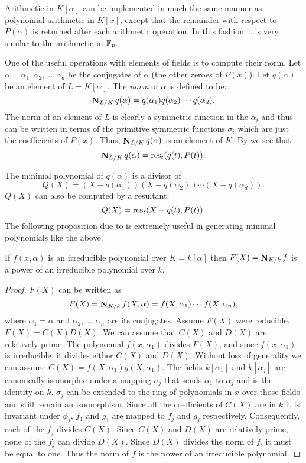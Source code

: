 Arithmetic in $K[\alpha]$ can be implemented in much the same manner
as polynomial arithmetic in $K[x]$, except that the remainder with
respect to $P(\alpha)$ is returned after each arithmetic operation.
In this fashion it is very similar to the arithmetic in
$\mathbb{F}_p$.

One of the useful operations with elements of fields is to compute their
norm.  Let $\alpha = \alpha_1,
\alpha_2, \ldots, \alpha_d$ be the conjugates of
$\alpha$ (the other zeroes of $P(x)$).  Let
$q(\alpha)$ be an element of $L = K[\alpha]$.  The {\em norm} of
$\alpha$ is defined to be:
\[
\mathop{\mathbf{N}}\nolimits_{L/K} q(\alpha) = q(\alpha_1) q(\alpha_2) \cdots q(\alpha_d).
\]
The norm of an element of $L$ is clearly a symmetric function in the
$\alpha_i$ and thus can be written in terms of the primitive symmetric
functions $\sigma_i$ which are just the coefficients of $P(x)$.  Thus,
$\mathop{\mathbf{N}}\nolimits_{L/K} q(\alpha)$ is an element of $K$.  By
 we see that
\[
\mathop{\mathbf{N}}\nolimits_{L/K} q(\alpha) = \mathop{\rm res}\nolimits_t (q(t), P(t)).
\]

The minimal polynomial of $q(\alpha)$ is a divisor of 
\[
Q(X) = (X - q(\alpha_1))(X - q(\alpha_2)) \cdots (X - q(\alpha_d)).
\]
$Q(X)$ can also be computed by a resultant:
\begin{equation} \label{AlgElt:Min:Eq}
Q(X) = \mathop{\rm res}\nolimits_t (X - q(t), P(t)).
\end{equation}
The following proposition due to {\Trager} \cite{Trager76a} is
extremely useful in generating minimal polynomials like the above.

\begin{proposition}[\Trager]
If $f(x, \alpha)$ is an irreducible polynomial over $K = k[\alpha]$
then $F(X) = \mathop{\mathbf{N}}\nolimits_{K/k} f$ is a power of an irreducible polynomial over $k$.
\end{proposition}

\begin{proof}
$F(X)$ can be written as
\[
F(X) = \mathop{\mathbf{N}}\nolimits_{K/k} f(X, \alpha) = f(X, \alpha_1) \cdots f(X, \alpha_n),
\]
where $\alpha_1 = \alpha$ and $\alpha_2, \ldots, \alpha_n$ are its
conjugates. Assume $F(X)$ were reducible, $F(X)= C(X)
D(X)$.  We can assume that $C(X)$ and $D(X)$ are relatively prime.
The polynomial $f(x, \alpha_1)$ divides $F(X)$, and since $f(x,
\alpha_1)$ is irreducible, it divides either $C(X)$ and $D(X)$.
Without loss of generality we can assume $C(X) = f(X, \alpha_1) g(X,
\alpha_1)$.  The fields $k[\alpha_1]$ and $k[\alpha_j]$ are
canonically isomorphic under a mapping $\sigma_j$ that sends
$\alpha_1$ to $\alpha_j$ and is the identity on $k$.  $\sigma_j$ can
be extended to the ring of polynomials in $x$ over those fields and
still remain an isomorphism.  Since all the coefficients of $C(X)$ are
in $k$ it is invariant under $\phi_j$, $f_1$ and $g_1$ are mapped to
$f_j$ and $g_j$ respectively.  Consequently, each of the $f_j$ divides
$C(X)$.  Since $C(X)$ and $D(X)$ are relatively prime, none of the
$f_j$ can divide $D(X)$.  Since $D(X)$ divides the norm of $f$, it
must be equal to one. Thus the norm of $f$ is the power of an
irreducible polynomial.
\end{proof}

